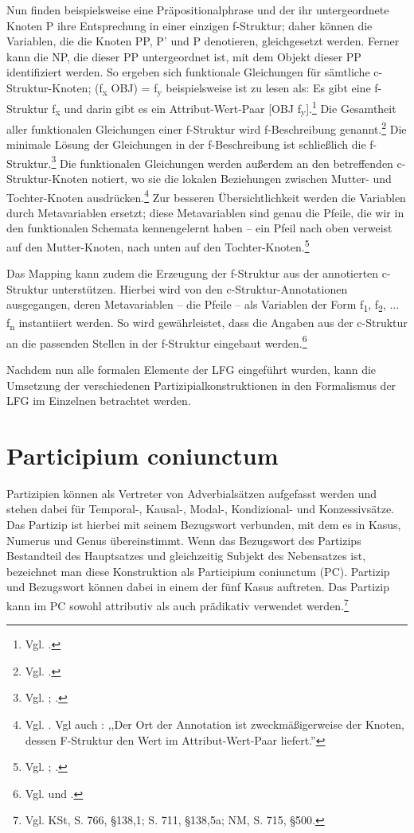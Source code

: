\documentclass[12pt,a4paper]{article}
\begin{document}
Nun finden beispielsweise eine Präpositionalphrase und der ihr untergeordnete Knoten P ihre Entsprechung in einer einzigen f-Struktur; daher können die Variablen, die die Knoten PP, P' und P denotieren, gleichgesetzt werden. Ferner kann die NP, die dieser PP untergeordnet ist, mit dem Objekt dieser PP identifiziert werden. So ergeben sich funktionale Gleichungen für sämtliche c-Struktur-Knoten; (f\textsubscript{x} OBJ) = f\textsubscript{y} beispielsweise ist zu lesen als: Es gibt eine f-Struktur f\textsubscript{x} und darin gibt es ein Attribut-Wert-Paar [OBJ f\textsubscript{y}].\footnote{Vgl. \cite[12]{Skript}.}
Die Gesamtheit aller funktionalen Gleichungen einer f-Struktur wird f-Beschreibung genannt.\footnote{Vgl. \cite[66-8]{Falk}.} Die minimale Lösung der Gleichungen in der f-Beschreibung ist schließlich die f-Struktur.\footnote{Vgl. \cite[68]{Falk}; \cite[17]{Skript}.}
\newpage
Die funktionalen Gleichungen werden außerdem an den betreffenden c-Struktur-Knoten notiert, wo sie die lokalen Beziehungen zwischen Mutter- und Tochter-Knoten ausdrücken.\footnote{Vgl. \cite[69]{Falk}. Vgl auch \cite[12]{Skript}: ,,Der Ort der Annotation ist zweckmäßigerweise der Knoten, dessen F-Struktur den Wert im Attribut-Wert-Paar liefert.''} Zur besseren Übersichtlichkeit werden die Variablen durch Metavariablen ersetzt; diese Metavariablen sind genau die Pfeile, die wir in den funktionalen Schemata kennengelernt haben -- ein Pfeil nach oben verweist auf den Mutter-Knoten, nach unten auf den Tochter-Knoten.\footnote{Vgl. \cite[69]{Falk}; \cite[15-6]{Skript}.}

Das Mapping kann zudem die Erzeugung der f-Struktur aus der annotierten c-Struktur unterstützen. Hierbei wird von den c-Struktur-Annotationen ausgegangen, deren Metavariablen -- die Pfeile -- als Variablen der Form f\textsubscript{1}, f\textsubscript{2}, ... f\textsubscript{n} instantiiert werden. So wird gewährleistet, dass die Angaben aus der c-Struktur an die passenden Stellen in der f-Struktur eingebaut werden.\footnote{Vgl. \cite[34]{Rohrer} und \cite[8; 10-11; 14; 17; 19; 28; 54]{Skript}.} 

Nachdem nun alle formalen Elemente der LFG eingeführt wurden, kann die Umsetzung der verschiedenen Partizipialkonstruktionen in den Formalismus der LFG im Einzelnen betrachtet werden.

\section{Participium coniunctum}
Partizipien können als Vertreter von Adverbialsätzen aufgefasst werden und stehen dabei für Temporal-, Kausal-, Modal-, Kondizional- und Konzessivsätze. Das Partizip ist hierbei mit seinem Bezugswort verbunden, mit dem es in Kasus, Numerus und Genus übereinstimmt. Wenn das Bezugswort des Partizips Bestandteil des Hauptsatzes und gleichzeitig Subjekt des Nebensatzes ist, bezeichnet man diese Konstruktion als Participium coniunctum (PC). Partizip und Bezugswort können dabei in einem der fünf Kasus  auftreten. Das Partizip kann im PC sowohl attributiv als auch prädikativ verwendet werden.\footnote{Vgl. KSt, S. 766, §138,1; S. 711, §138,5a; NM, S. 715, §500.}
\end{document}
